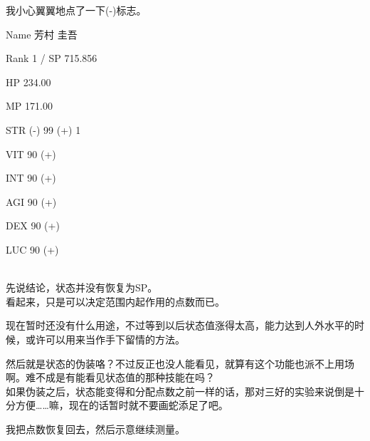 我小心翼翼地点了一下(-)标志。\\

\cardline

  Name 芳村 圭吾

  Rank 1 / SP 715.856

  HP  234.00

  MP  171.00

%  
 

  STR (-) 99 (+)  {1}

  VIT 90 (+)

  INT 90 (+)

  AGI 90 (+)

  DEX 90 (+)

  LUC 90 (+)

\cardline\\

先说结论，状态并没有恢复为SP。\\

看起来，只是可以决定范围内起作用的点数而已。

现在暂时还没有什么用途，不过等到以后状态值涨得太高，能力达到人外水平的时候，或许可以用来当作手下留情的方法。

然后就是状态的伪装咯？不过反正也没人能看见，就算有这个功能也派不上用场啊。难不成是有能看见状态值的那种技能在吗？\\

如果伪装之后，状态能变得和分配点数之前一样的话，那对三好的实验来说倒是十分方便……嘛，现在的话暂时就不要画蛇添足了吧。

我把点数恢复回去，然后示意继续测量。\\


